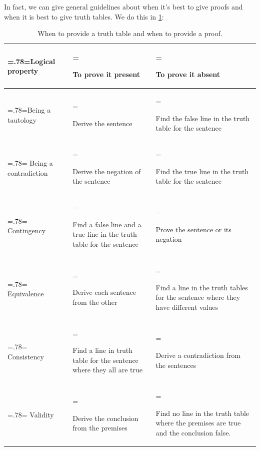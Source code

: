 In fact, we can give general guidelines about when it's best to give proofs and when it is best to give truth tables. We do this in \cref{table:ProofOrModel}:


\begin{table}[h]
\renewcommand{\tabularxcolumn}[1]{m{#1}}
\setlength{\extrarowheight}{1ex}
\begin{tabularx}{\linewidth}{>{\hsize=.78\hsize\linewidth=\hsize\centering\arraybackslash}X || >{\hsize=1.11\hsize\linewidth=\hsize\raggedright\arraybackslash}X | >{\hsize=1.11\hsize\linewidth=\hsize\raggedright\arraybackslash}X}
\textbf{Logical property} 	&	\textbf{To prove it present} 	&	\textbf{To prove it absent} \\ \hline \hline
Being a tautology 		& Derive the sentence  						& Find the false line in the truth table for the sentence \\ \hline
Being a contradiction 	&  Derive the negation of the sentence  		 & Find the true line in the truth table for the sentence\\ \hline
Contingency 			& Find a false line and a true line in the truth table for the sentence & Prove the sentence or its negation\\ \hline
Equivalence 			& Derive each sentence from the other 		 & Find a line in the truth tables for the sentence where they have different values\\ \hline
Consistency 		& Find a line in truth table for the sentence where they all are true & Derive a contradiction from the sentences\\ \hline
Validity 				& Derive the conclusion from the premises & Find no line in the truth table where the premises are true and the conclusion false. \\
\end{tabularx}
\caption{When to provide a truth table and when to provide a proof.}
\label{table:ProofOrModel}
\end{table}



